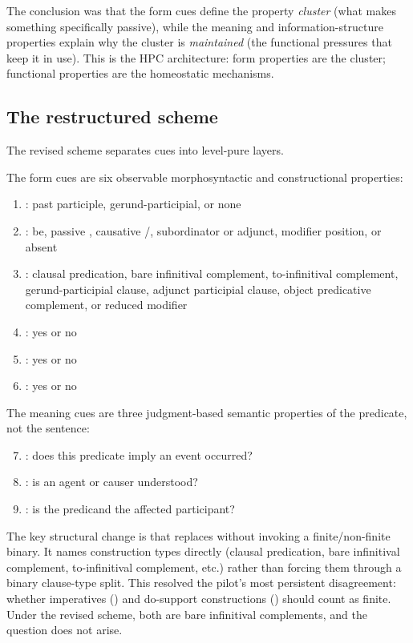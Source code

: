 \documentclass[12pt]{article}
\begin{document}
The conclusion was that the form cues define the property \emph{cluster} (what makes something specifically passive), while the meaning and information-structure properties explain why the cluster is \emph{maintained} (the functional pressures that keep it in use). This is the HPC architecture: form properties are the cluster; functional properties are the homeostatic mechanisms.

\subsection{The restructured scheme}

The revised scheme separates cues into level-pure layers.

The form cues are six observable morphosyntactic and constructional properties:

\begin{enumerate}
\item {}: past participle, gerund-participial, or none
\item {}: be, passive , causative /, subordinator or adjunct, modifier position, or absent
\item {}: clausal predication, bare infinitival complement, to-infinitival complement, gerund-participial clause, adjunct participial clause, object predicative complement, or reduced modifier
\item {}: yes or no
\item {}: yes or no
\item {}: yes or no
\end{enumerate}

The meaning cues are three judgment-based semantic properties of the predicate, not the sentence:

\begin{enumerate}
\setcounter{enumi}{6}
\item {}: does this predicate imply an event occurred?
\item {}: is an agent or causer understood?
\item {}: is the predicand the affected participant?
\end{enumerate}

The key structural change is that  replaces  without invoking a finite/non-finite binary. It names construction types directly (clausal predication, bare infinitival complement, to-infinitival complement, etc.) rather than forcing them through a binary clause-type split. This resolved the pilot's most persistent disagreement: whether imperatives () and do-support constructions () should count as finite. Under the revised scheme, both are bare infinitival complements, and the question does not arise.
\end{document}
